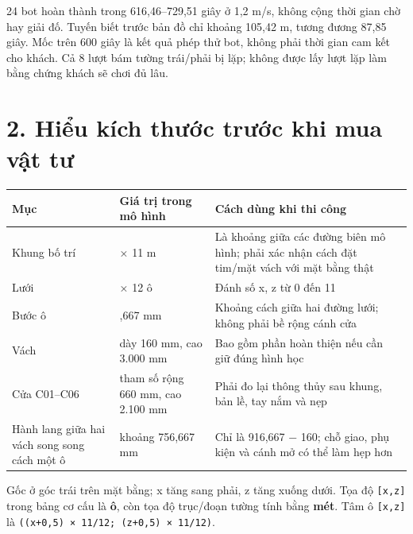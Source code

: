 \documentclass[
  11pt,
  a4paper,
]{article}
\newcounter{none} %
\begin{document}
24 bot hoàn thành trong 616,46--729,51 giây ở 1,2 m/s, không cộng thời
gian chờ hay giải đố. Tuyến biết trước bản đồ chỉ khoảng 105,42 m, tương
đương 87,85 giây. Mốc trên 600 giây là kết quả phép thử bot, không phải
thời gian cam kết cho khách. Cả 8 lượt bám tường trái/phải bị lặp; không
được lấy lượt lặp làm bằng chứng khách sẽ chơi đủ lâu.

\section{2. Hiểu kích thước trước khi mua vật
tư}\label{hiux1ec3u-kuxedch-thux1b0ux1edbc-trux1b0ux1edbc-khi-mua-vux1eadt-tux1b0}

{\def\LTcaptype{none} %
\begin{longtable}[]{@{}
  >{\raggedright\arraybackslash}p{}
  >{\raggedright\arraybackslash}p{}
  >{\raggedright\arraybackslash}p{}@{}}
\toprule\noalign{}
\begin{minipage}[b]{\linewidth}\raggedright
Mục
\end{minipage} & \begin{minipage}[b]{\linewidth}\raggedright
Giá trị trong mô hình
\end{minipage} & \begin{minipage}[b]{\linewidth}\raggedright
Cách dùng khi thi công
\end{minipage} \\
\midrule\noalign{}
\endhead
\bottomrule\noalign{}
\endlastfoot
Khung bố trí & 11 × 11 m & Là khoảng giữa các đường biên mô hình; phải
xác nhận cách đặt tim/mặt vách với mặt bằng thật \\
Lưới & 12 × 12 ô & Đánh số x, z từ 0 đến 11 \\
Bước ô & 916,667 mm & Khoảng cách giữa hai đường lưới; không phải bề
rộng cánh cửa \\
Vách & dày 160 mm, cao 3.000 mm & Bao gồm phần hoàn thiện nếu cần giữ
đúng hình học \\
Cửa C01--C06 & tham số rộng 660 mm, cao 2.100 mm & Phải đo lại thông
thủy sau khung, bản lề, tay nắm và nẹp \\
Hành lang giữa hai vách song song cách một ô & khoảng 756,667 mm & Chỉ
là 916,667 − 160; chỗ giao, phụ kiện và cánh mở có thể làm hẹp hơn \\
\end{longtable}
}

Gốc ở góc trái trên mặt bằng; x tăng sang phải, z tăng xuống dưới. Tọa
độ \texttt{{[}x,z{]}} trong bảng cơ cấu là \textbf{ô}, còn tọa độ
trục/đoạn tường tính bằng \textbf{mét}. Tâm ô \texttt{{[}x,z{]}} là
\texttt{((x+0,5)\ ×\ 11/12;\ (z+0,5)\ ×\ 11/12)}.
\end{document}
